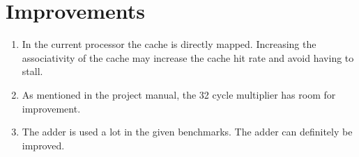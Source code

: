 \documentclass[final]{article}
\begin{document}
\section{Improvements}
\label{sec:improvements}
\begin{enumerate}
\item In the current processor the cache is directly mapped. Increasing the associativity of the cache may increase the cache hit rate and avoid having to stall.
\item As mentioned in the project manual, the 32 cycle multiplier has room for improvement.
\item The adder is used a lot in the given benchmarks. The adder can definitely be improved.
\end{enumerate}
\end{document}
